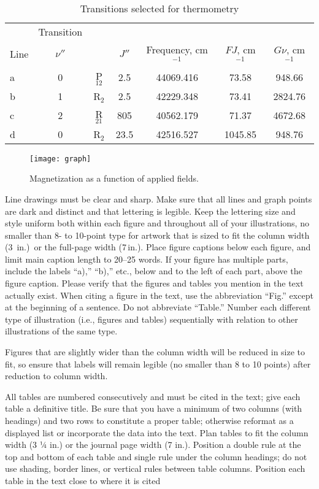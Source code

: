 \begin{table}[hbt!]
\caption{\label{tab:table1} Transitions selected for thermometry}
\centering
\begin{tabular}{lcccccc}
\hline
& Transition& & \multicolumn{2}{c}{}\\\cline{2-2}
Line& $\nu''$& & $J'' $& Frequency, cm$^{-1}$& $FJ$, cm$^{-1}$& $G\nu $, cm$^{-1}$\\\hline
a& 0& P$_{12}$& 2.5& 44069.416& 73.58& 948.66\\
b& 1& R$_{2}$& 2.5& 42229.348& 73.41& 2824.76\\
c& 2& R$_{21}$& 805& 40562.179& 71.37& 4672.68\\
d& 0& R$_{2}$& 23.5& 42516.527& 1045.85& 948.76\\
\hline
\end{tabular}
\end{table}


\begin{figure}[hbt!]
\centering
\texttt{[image: graph]}
\caption{Magnetization as a function of applied fields.}
\end{figure}

Line drawings must be clear and sharp. Make sure that all lines and graph points are dark and distinct and that lettering is legible. Keep the lettering size and style uniform both within each figure and throughout all of your illustrations, no smaller than 8- to 10-point type for artwork that is sized to fit the column width (3\,\textonequarter{} in.)~or the full-page width (7\,in.). Place figure captions below each figure, and limit main caption length to 20--25 words. If your figure has multiple parts, include the labels “a),” “b),” etc., below and to the left of each part, above the figure caption. Please verify that the figures and tables you mention in the text actually exist. When citing a figure in the text, use the abbreviation “Fig.” except at the beginning of a sentence. Do not abbreviate “Table.” Number each different type of illustration (i.e., figures and tables) sequentially with relation to other illustrations of the same type.

Figures that are slightly wider than the column width will be reduced in size to fit, so ensure that labels will remain legible (no smaller than 8 to 10 points) after reduction to column width. 

All tables are numbered consecutively and must be cited in the text; give each table a definitive title. Be sure that you have a minimum of two columns (with headings) and two rows to constitute a proper table; otherwise reformat as a displayed list or incorporate the data into the text. Plan tables to fit the column width (3 ¼ in.) or the journal page width (7 in.). Position a double rule at the top and bottom of each table and single rule under the column headings; do not use shading, border lines, or vertical rules between table columns. Position each table in the text close to where it is cited
